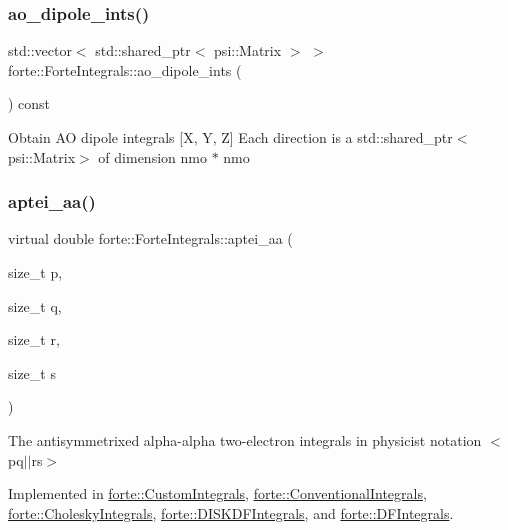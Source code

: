 \subsubsection{\texorpdfstring{ao\+\_\+dipole\+\_\+ints()}{ao\_dipole\_ints()}}
{\footnotesize\ttfamily std\+::vector$<$ std\+::shared\+\_\+ptr$<$ psi\+::\+Matrix $>$ $>$ forte\+::\+Forte\+Integrals\+::ao\+\_\+dipole\+\_\+ints (\begin{DoxyParamCaption}{ }\end{DoxyParamCaption}) const}

Obtain AO dipole integrals \mbox{[}X, Y, Z\mbox{]} Each direction is a std\+::shared\+\_\+ptr$<$psi\+::\+Matrix$>$ of dimension nmo $\ast$ nmo \mbox{\label{classforte_1_1_forte_integrals_afc84c157025b56ee0f8e3b1abe1c0a5f}} 
\subsubsection{\texorpdfstring{aptei\+\_\+aa()}{aptei\_aa()}}
{\footnotesize\ttfamily virtual double forte\+::\+Forte\+Integrals\+::aptei\+\_\+aa (\begin{DoxyParamCaption}\item[{size\+\_\+t}]{p,  }\item[{size\+\_\+t}]{q,  }\item[{size\+\_\+t}]{r,  }\item[{size\+\_\+t}]{s }\end{DoxyParamCaption})\hspace{0.3cm}{\ttfamily [pure virtual]}}



The antisymmetrixed alpha-\/alpha two-\/electron integrals in physicist notation $<$pq$\vert$$\vert$rs$>$ 



Implemented in \mbox{\hyperlink{classforte_1_1_custom_integrals_a933807bd0f7a711329edb83b9b9915f0}{forte\+::\+Custom\+Integrals}}, \mbox{\hyperlink{classforte_1_1_conventional_integrals_a4df626960614077f1df435efba44bd0a}{forte\+::\+Conventional\+Integrals}}, \mbox{\hyperlink{classforte_1_1_cholesky_integrals_a118be3ea0020672f3d3e6ce4602cc14c}{forte\+::\+Cholesky\+Integrals}}, \mbox{\hyperlink{classforte_1_1_d_i_s_k_d_f_integrals_a3a815a39bc2f01a1cb5398e857f56285}{forte\+::\+D\+I\+S\+K\+D\+F\+Integrals}}, and \mbox{\hyperlink{classforte_1_1_d_f_integrals_aa495745fe55286ec7b4ff10ec6d22fae}{forte\+::\+D\+F\+Integrals}}.

